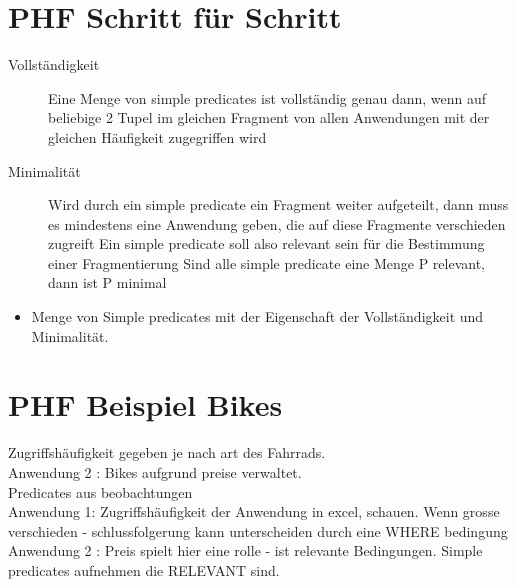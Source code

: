 \documentclass[a4paper,10pt,titlepage=false]{scrreprt}
\begin{document}
\section{PHF Schritt für Schritt}
\begin{description}
 \item [Vollständigkeit] Eine Menge von simple predicates ist vollständig genau
dann, wenn auf beliebige 2 Tupel im gleichen Fragment
von allen Anwendungen mit der gleichen Häufigkeit
zugegriffen wird
\item[Minimalität] Wird durch ein simple predicate ein Fragment weiter
aufgeteilt, dann muss es mindestens eine Anwendung
geben, die auf diese Fragmente verschieden zugreift
Ein simple predicate soll also relevant sein für die
Bestimmung einer Fragmentierung
Sind alle simple predicate eine Menge P relevant, dann ist
P minimal
\end{description}

\begin{itemize}
 \item Menge von Simple predicates mit der Eigenschaft der Vollständigkeit und Minimalität.
 
\end{itemize}

\section{PHF Beispiel Bikes} %
Zugriffshäufigkeit gegeben je nach art des Fahrrads. \\
Anwendung 2 : Bikes aufgrund preise verwaltet. \\ Predicates aus beobachtungen\\
Anwendung 1:
Zugriffshäufigkeit der Anwendung in excel, schauen. Wenn grosse verschieden  - schlussfolgerung kann unterscheiden 
durch eine WHERE bedingung
Anwendung 2 :
Preis spielt hier eine rolle - ist relevante Bedingungen. Simple predicates aufnehmen die RELEVANT sind.
\end{document}
